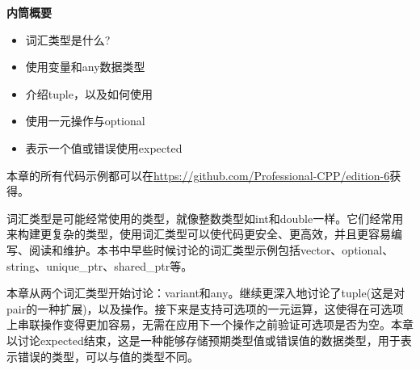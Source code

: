 \noindent
\textbf{内筒概要}

\begin{itemize}
\item
词汇类型是什么?

\item
使用变量和any数据类型

\item
介绍tuple，以及如何使用

\item
使用一元操作与optional

\item
表示一个值或错误使用expected
\end{itemize}

本章的所有代码示例都可以在\url{https://github.com/Professional-CPP/edition-6}获得。

词汇类型是可能经常使用的类型，就像整数类型如int和double一样。它们经常用来构建更复杂的类型，使用词汇类型可以使代码更安全、更高效，并且更容易编写、阅读和维护。本书中早些时候讨论的词汇类型示例包括vector、optional、string、unique\_ptr、shared\_ptr等。

本章从两个词汇类型开始讨论：variant和any。继续更深入地讨论了tuple(这是对pair的一种扩展)，以及操作。接下来是支持可选项的一元运算，这使得在可选项上串联操作变得更加容易，无需在应用下一个操作之前验证可选项是否为空。本章以讨论expected结束，这是一种能够存储预期类型值或错误值的数据类型，用于表示错误的类型，可以与值的类型不同。
